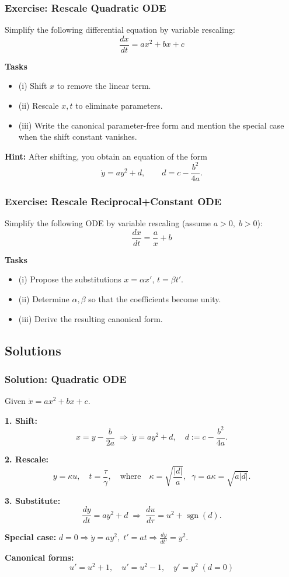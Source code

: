 \documentclass{beamer}
\begin{document}
\begin{frame}
\frametitle{Exercise: Rescale Quadratic ODE}

Simplify the following differential equation by variable rescaling:
\[
\frac{dx}{dt} = a x^{2} + b x + c
\]

\textbf{Tasks}
\begin{itemize}
  \item (i) Shift \(x\) to remove the linear term.
  \item (ii) Rescale \(x,t\) to eliminate parameters.
  \item (iii) Write the canonical parameter-free form and mention the special case when the shift constant vanishes.
\end{itemize}

\textbf{Hint:} After shifting, you obtain an equation of the form
\[
\dot{y} = a y^2 + d, \qquad d = c - \frac{b^2}{4a}.
\]
\end{frame}

\begin{frame}
\frametitle{Exercise: Rescale Reciprocal+Constant ODE}

Simplify the following ODE by variable rescaling (assume \(a>0,\; b>0\)):
\[
\frac{dx}{dt} = \frac{a}{x} + b
\]

\textbf{Tasks}
\begin{itemize}
  \item (i) Propose the substitutions \(x=\alpha x'\), \(t=\beta t'\).
  \item (ii) Determine \(\alpha,\beta\) so that the coefficients become unity.
  \item (iii) Derive the resulting canonical form.
\end{itemize}
\end{frame}

\subsection{Solutions}

\begin{frame}
\frametitle{Solution: Quadratic ODE}
\small
Given \(\dot x = a x^2 + b x + c\).

\textbf{1. Shift:}
\[
x = y - \frac{b}{2a} \;\Rightarrow\; \dot y = a y^2 + d, 
\quad d := c - \frac{b^2}{4a}.
\]

\textbf{2. Rescale:}
\[
y = \kappa u, \quad t = \frac{\tau}{\gamma}, 
\quad \text{where} \quad 
\kappa = \sqrt{\frac{|d|}{a}}, \;\; \gamma = a\kappa = \sqrt{a|d|}.
\]

\textbf{3. Substitute:}
\[
\frac{dy}{dt} = a y^2 + d 
\;\Rightarrow\;
\frac{du}{d\tau} = u^2 + \operatorname{sgn}(d).
\]

\textbf{Special case:} \(d = 0 \Rightarrow \dot y = a y^2,\; t' = a t \Rightarrow \tfrac{dy}{dt'} = y^2.\)

\textbf{Canonical forms:}
\[
\boxed{u' = u^2 + 1}, \quad
\boxed{u' = u^2 - 1}, \quad
\boxed{y' = y^2}\; (d=0)
\]
\end{frame}
\end{document}
